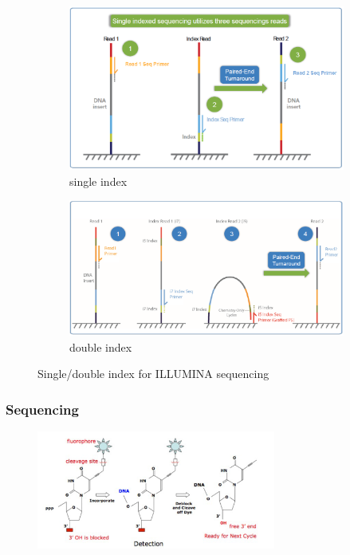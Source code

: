         \begin{figure}[H]
            \centering
            \begin{subfigure}[b]{0.39\textwidth}
                \centering
                \includegraphics[width=\textwidth]{singleIndex}
                \caption{single index}
            \end{subfigure}
            \hfill
            \begin{subfigure}[b]{0.60\textwidth}
                \centering
                \includegraphics[width=\textwidth]{doubleIndex}
                \caption{double index}
            \end{subfigure}
            \caption{Single/double index for ILLUMINA sequencing}
            \label{singDoubInd}
        \end{figure}

        \subsubsection{Sequencing}

        \begin{figure}[H]
            \caption{}
            \centering
            \includegraphics[width=0.7\textwidth]{ILLUMINArev}
            \label{ILLUMINArev}
        \end{figure}

